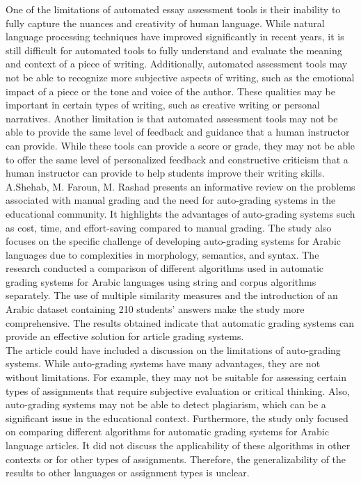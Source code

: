 One of the limitations of automated essay assessment tools is their inability to fully capture the nuances and creativity of human language. While natural language processing techniques have improved significantly in recent years, it is still difficult for automated tools to fully understand and evaluate the meaning and context of a piece of writing. Additionally, automated assessment tools may not be able to recognize more subjective aspects of writing, such as the emotional impact of a piece or the tone and voice of the author. These qualities may be important in certain types of writing, such as creative writing or personal narratives. Another limitation is that automated assessment tools may not be able to provide the same level of feedback and guidance that a human instructor can provide. While these tools can provide a score or grade, they may not be able to offer the same level of personalized feedback and constructive criticism that a human instructor can provide to help students improve their writing skills. \cite{dadi2020overview}\\

A.Shehab, M. Faroun, M. Rashad presents an informative review on the problems associated with manual grading and the need for auto-grading systems in the educational community. It highlights the advantages of auto-grading systems such as cost, time, and effort-saving compared to manual grading. The study also focuses on the specific challenge of developing auto-grading systems for Arabic languages due to complexities in morphology, semantics, and syntax. The research conducted a comparison of different algorithms used in automatic grading systems for Arabic languages using string and corpus algorithms separately. The use of multiple similarity measures and the introduction of an Arabic dataset containing 210 students’ answers make the study more comprehensive. The results obtained indicate that automatic grading systems can provide an effective solution for article grading systems.\\

The article could have included a discussion on the limitations of auto-grading systems. While auto-grading systems have many advantages, they are not without limitations. For example, they may not be suitable for assessing certain types of assignments that require subjective evaluation or critical thinking. Also, auto-grading systems may not be able to detect plagiarism, which can be a significant issue in the educational context. Furthermore, the study only focused on comparing different algorithms for automatic grading systems for Arabic language articles. It did not discuss the applicability of these algorithms in other contexts or for other types of assignments. Therefore, the generalizability of the results to other languages or assignment types is unclear. \cite{shehab2018automatic}

